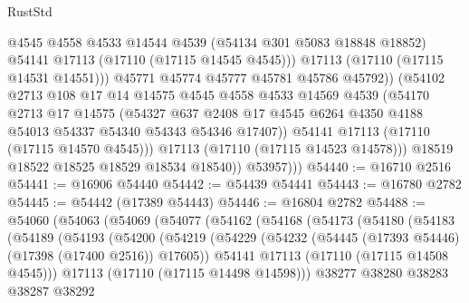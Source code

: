 \begin{lexlean}{RustStd}
\begin{coremodule}
                        @4545
                        @4558
                        @4533
                        @14544
                        @4539
                        (@54134 @301 @5083 @18848 @18852)
                        @54141
                        @17113
                        (@17110 (@17115 @14545 @4545)))
                      @17113
                      (@17110 (@17115 @14531 @14551)))
                    @45771
                    @45774
                    @45777
                    @45781
                    @45786
                    @45792))
                (@54102
                  @2713
                  @108
                  @17
                  @14
                  @14575
                  @4545
                  @4558
                  @4533
                  @14569
                  @4539
                  (@54170
                    @2713
                    @17
                    @14575
                    (@54327
                      @637
                      @2408
                      @17
                      @4545
                      @6264
                      @4350
                      @4188
                      @54013
                      @54337
                      @54340
                      @54343
                      @54346
                      @17407))
                  @54141
                  @17113
                  (@17110 (@17115 @14570 @4545)))
                @17113
                (@17110 (@17115 @14523 @14578)))
              @18519
              @18522
              @18525
              @18529
              @18534
              @18540))
          @53957)))
@54440 := @16710 @2516
@54441 := @16906 @54440
@54442 := @54439 @54441
@54443 := @16780 @2782
@54445 := @54442 (@17389 @54443)
@54446 := @16804 @2782
@54488 := @54060
    (@54063
      (@54069
        (@54077
          (@54162
            (@54168
              (@54173
                (@54180
                  (@54183
                    (@54189
                      (@54193
                        (@54200
                          (@54219
                            (@54229
                              (@54232 (@54445 (@17393 @54446) (@17398 (@17400 @2516)) @17605))
                              @54141
                              @17113
                              (@17110 (@17115 @14508 @4545)))
                            @17113
                            (@17110 (@17115 @14498 @14598)))
                          @38277
                          @38280
                          @38283
                          @38287
                          @38292

\end{coremodule}
\end{lexlean}
